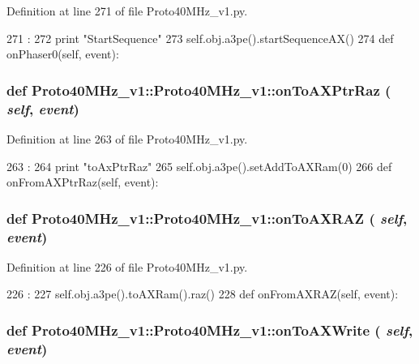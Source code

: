 Definition at line 271 of file Proto40MHz\_\-v1.py.


\begin{DoxyCode}
271                                      :
272         print "StartSequence"
273         self.obj.a3pe().startSequenceAX()
274         
    def onPhaser0(self, event):
\end{DoxyCode}
\hypertarget{classProto40MHz__v1_1_1Proto40MHz__v1_aad240c497b699ca31fd7edc4c120ab9e}{
\subsubsection[{onToAXPtrRaz}]{\setlength{\rightskip}{0pt plus 5cm}def Proto40MHz\_\-v1::Proto40MHz\_\-v1::onToAXPtrRaz ( {\em self}, \/   {\em event})}}
\label{classProto40MHz__v1_1_1Proto40MHz__v1_aad240c497b699ca31fd7edc4c120ab9e}


Definition at line 263 of file Proto40MHz\_\-v1.py.


\begin{DoxyCode}
263                                  :
264         print "toAxPtrRaz"
265         self.obj.a3pe().setAddToAXRam(0)
266 
    def onFromAXPtrRaz(self, event):
\end{DoxyCode}
\hypertarget{classProto40MHz__v1_1_1Proto40MHz__v1_af3222e5a086e116a86635b987e662d26}{
\subsubsection[{onToAXRAZ}]{\setlength{\rightskip}{0pt plus 5cm}def Proto40MHz\_\-v1::Proto40MHz\_\-v1::onToAXRAZ ( {\em self}, \/   {\em event})}}
\label{classProto40MHz__v1_1_1Proto40MHz__v1_af3222e5a086e116a86635b987e662d26}


Definition at line 226 of file Proto40MHz\_\-v1.py.


\begin{DoxyCode}
226                               :
227         self.obj.a3pe().toAXRam().raz()
228 
    def onFromAXRAZ(self, event):
\end{DoxyCode}
\hypertarget{classProto40MHz__v1_1_1Proto40MHz__v1_a204ef09e7b517385d34dc5d0c9c2b3ab}{
\subsubsection[{onToAXWrite}]{\setlength{\rightskip}{0pt plus 5cm}def Proto40MHz\_\-v1::Proto40MHz\_\-v1::onToAXWrite ( {\em self}, \/   {\em event})}}
\label{classProto40MHz__v1_1_1Proto40MHz__v1_a204ef09e7b517385d34dc5d0c9c2b3ab}


